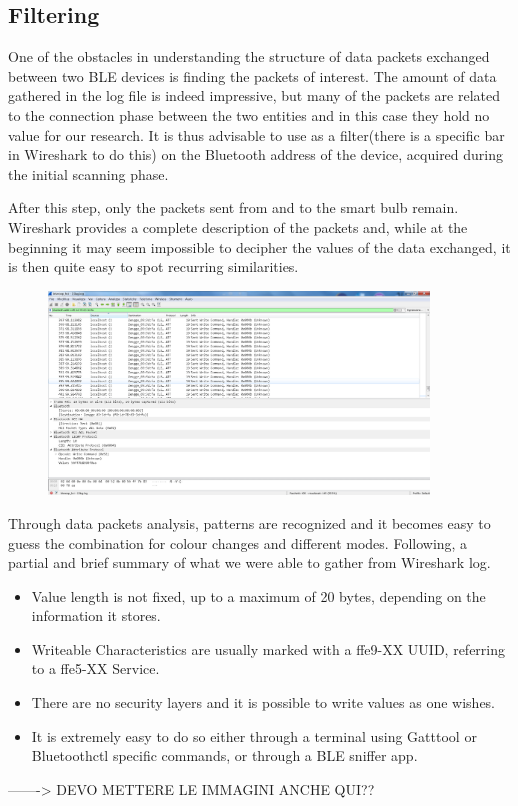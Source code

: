 \subsection {Filtering}
One of the obstacles in understanding the structure of data packets exchanged between two BLE devices is finding the packets of interest. The amount of data gathered in the log file is indeed impressive, but many of the packets are related to the connection phase between the two entities and  in this case they hold no value for our research.
It is thus advisable to use as a filter(there is a specific bar in Wireshark to do this) on the Bluetooth address of the device, acquired during the initial scanning phase.

After this step, only the packets sent from and to the smart bulb remain. Wireshark provides a complete description of the packets and, while at the beginning it may seem impossible to decipher the values of the data exchanged, it is then quite easy to spot recurring similarities.

\begin{figure}
	\centering
	\includegraphics[width=0.9\textwidth]{wireshark1}
	\label{fig:images\wireshark1}
\end{figure}

Through data packets analysis, patterns are recognized and it becomes easy to guess the combination for colour changes and different modes. Following, a partial and brief summary of what we were able to gather from Wireshark log.

\begin{itemize}
	\item Value length is not fixed, up to a maximum of 20 bytes, depending on the information it stores.
	\item Writeable Characteristics are usually marked with a ffe9-XX UUID, referring to a ffe5-XX Service.
	\item There are no security layers and it is possible to write values as one wishes.
	\item It is extremely easy to do so either through a terminal using Gatttool or Bluetoothctl specific commands, or through a BLE sniffer app.
\end{itemize}
-------> DEVO METTERE LE IMMAGINI ANCHE QUI??

